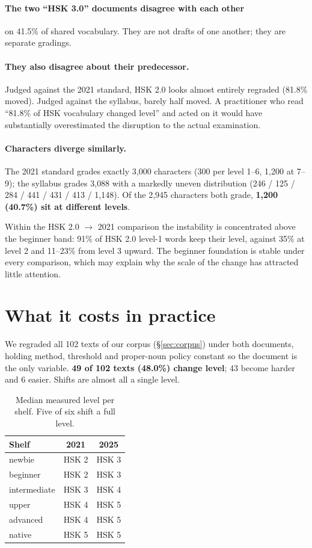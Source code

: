 \documentclass[11pt]{article}
\begin{document}
\paragraph{The two ``HSK 3.0'' documents disagree with each other} on 41.5\% of
shared vocabulary. They are not drafts of one another; they are separate
gradings.

\paragraph{They also disagree about their predecessor.} Judged against the 2021
standard, HSK 2.0 looks almost entirely regraded (81.8\% moved). Judged against
the syllabus, barely half moved. A practitioner who read ``81.8\% of HSK
vocabulary changed level'' and acted on it would have substantially
overestimated the disruption to the actual examination.

\paragraph{Characters diverge similarly.} The 2021 standard grades exactly
3{,}000 characters (300 per level 1--6, 1{,}200 at 7--9); the syllabus grades
3{,}088 with a markedly uneven distribution (246 / 125 / 284 / 441 / 431 / 413
/ 1{,}148). Of the 2{,}945 characters both grade, \textbf{1{,}200 (40.7\%) sit
at different levels}.

Within the HSK 2.0 $\rightarrow$ 2021 comparison the instability is
concentrated above the beginner band: 91\% of HSK 2.0 level-1 words keep their
level, against 35\% at level 2 and 11--23\% from level 3 upward. The beginner
foundation is stable under every comparison, which may explain why the scale of
the change has attracted little attention.

\section{What it costs in practice}
\label{sec:cost}

We regraded all 102 texts of our corpus (\S\ref{sec:corpus}) under both
documents, holding method, threshold and proper-noun policy constant so the
document is the only variable. \textbf{49 of 102 texts (48.0\%) change level};
43 become harder and 6 easier. Shifts are almost all a single level.

\begin{table}[t]
\centering\small
\begin{tabular}{@{}lcc@{}}
\toprule
\textbf{Shelf} & \textbf{2021} & \textbf{2025} \\
\midrule
newbie       & HSK 2 & HSK 3 \\
beginner     & HSK 2 & HSK 3 \\
intermediate & HSK 3 & HSK 4 \\
upper        & HSK 4 & HSK 5 \\
advanced     & HSK 4 & HSK 5 \\
native       & HSK 5 & HSK 5 \\
\bottomrule
\end{tabular}
\caption{Median measured level per shelf. Five of six shift a full level.}
\label{tab:shelves}
\end{table}
\end{document}
